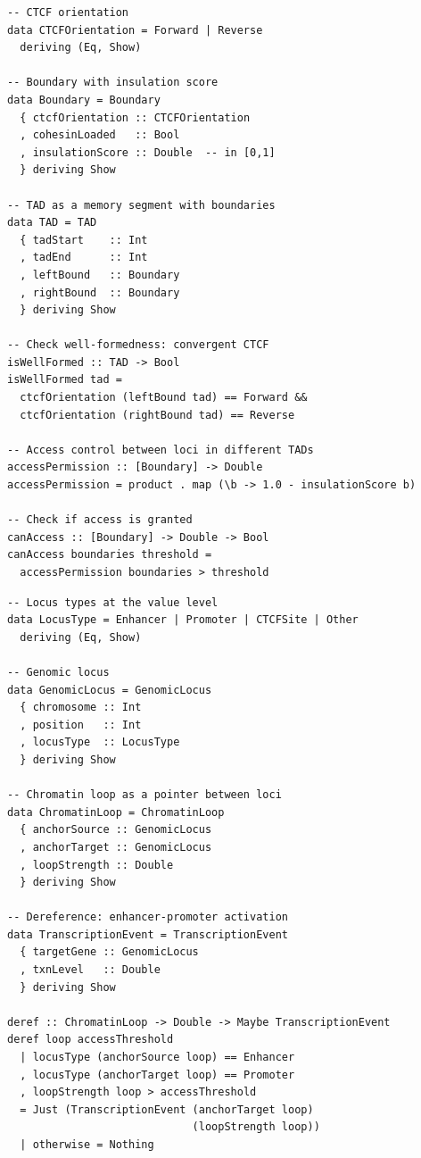 \documentclass[12pt,a4paper]{article}
\theoremstyle{plain}
\theoremstyle{definition}
\begin{document}
\begin{lstlisting}[language=DNALang, caption={TAD and boundary types}]
-- CTCF orientation
data CTCFOrientation = Forward | Reverse
  deriving (Eq, Show)

-- Boundary with insulation score
data Boundary = Boundary
  { ctcfOrientation :: CTCFOrientation
  , cohesinLoaded   :: Bool
  , insulationScore :: Double  -- in [0,1]
  } deriving Show

-- TAD as a memory segment with boundaries
data TAD = TAD
  { tadStart    :: Int
  , tadEnd      :: Int
  , leftBound   :: Boundary
  , rightBound  :: Boundary
  } deriving Show

-- Check well-formedness: convergent CTCF
isWellFormed :: TAD -> Bool
isWellFormed tad =
  ctcfOrientation (leftBound tad) == Forward &&
  ctcfOrientation (rightBound tad) == Reverse

-- Access control between loci in different TADs
accessPermission :: [Boundary] -> Double
accessPermission = product . map (\b -> 1.0 - insulationScore b)

-- Check if access is granted
canAccess :: [Boundary] -> Double -> Bool
canAccess boundaries threshold =
  accessPermission boundaries > threshold
\end{lstlisting}

\begin{lstlisting}[language=DNALang, caption={Chromatin loops as typed pointers}]
-- Locus types at the value level
data LocusType = Enhancer | Promoter | CTCFSite | Other
  deriving (Eq, Show)

-- Genomic locus
data GenomicLocus = GenomicLocus
  { chromosome :: Int
  , position   :: Int
  , locusType  :: LocusType
  } deriving Show

-- Chromatin loop as a pointer between loci
data ChromatinLoop = ChromatinLoop
  { anchorSource :: GenomicLocus
  , anchorTarget :: GenomicLocus
  , loopStrength :: Double
  } deriving Show

-- Dereference: enhancer-promoter activation
data TranscriptionEvent = TranscriptionEvent
  { targetGene :: GenomicLocus
  , txnLevel   :: Double
  } deriving Show

deref :: ChromatinLoop -> Double -> Maybe TranscriptionEvent
deref loop accessThreshold
  | locusType (anchorSource loop) == Enhancer
  , locusType (anchorTarget loop) == Promoter
  , loopStrength loop > accessThreshold
  = Just (TranscriptionEvent (anchorTarget loop)
                             (loopStrength loop))
  | otherwise = Nothing
\end{lstlisting}
\end{document}

